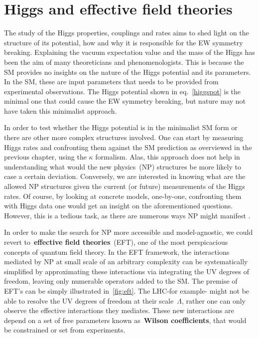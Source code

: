 \chapter{Higgs and effective field theories }\label{chap:HiggsEFT}
\par The study of the Higgs properties, couplings and rates aims to shed light on the structure of its potential, how and why it is responsible for the EW symmetry breaking. Explaining the vacuum expectation value and the mass of the Higgs has been the aim of many theoreticians and phenomenologists. This is because the SM provides no insights on the nature of the Higgs potential and its parameters.  In the SM, these are  input parameters that needs to be provided from experimental observations. The Higgs potential shown in eq.~\eqref{higgspot} is the minimal one that could cause the EW symmetry breaking, but nature may not have taken this minimalist approach. 
\par  In order to test whether the Higgs potential is in the minimalist SM form or there are other more complex structures involved. One can start by measuring Higgs rates and confronting them against the SM prediction as overviewed in the previous chapter, using the $\kappa$ formalism. Alas, this approach does not help in understanding what would the new physics~(NP) structures be more likely to case a certain deviation. Conversely, we are interested in knowing what are the allowed NP structures given the current (or future) measurements of the Higgs rates.  Of course, by looking at concrete models, one-by-one,  confronting them with Higgs data one would get an insight on the aforementioned questions. However, this is a  tedious task, as there are numerous ways NP might manifest . 
\par In order to make the search for NP more accessible and model-agnostic, we could revert to~\textbf{effective field theories}~(EFT), one of the most perspicacious concepts of quantum field theory. In the EFT framework, the interactions mediated by  NP at small scale of an arbitrary complexity can be systematically simplified by approximating these interactions via integrating the UV degrees of freedom, leaving only numerable operators added to the SM. The premise of EFT's can be simply illustrated in~\autoref{fig:eft}.  The LHC-for example- might not be able to resolve the UV degrees of freedom at their scale~$\Lambda$, rather one can only observe the effective interactions they mediates. These new interactions are depend on a set of free parameters known as~\textbf{Wilson coefficients}, that would be constrained or set from experiments. 
